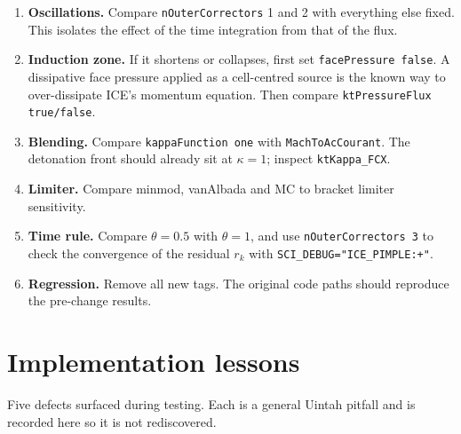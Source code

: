 \documentclass[11pt]{article}
\newcommand{\code}[1]{\texttt{\small #1}}
\begin{document}
\begin{enumerate}[leftmargin=*]
  \item \textbf{Oscillations.} Compare \code{nOuterCorrectors} 1 and 2 with everything else
        fixed. This isolates the effect of the time integration from that of the flux.
  \item \textbf{Induction zone.} If it shortens or collapses, first set
        \code{facePressure false}. A dissipative face pressure applied as a cell-centred
        source is the known way to over-dissipate ICE's momentum equation. Then compare
        \code{ktPressureFlux true/false}.
  \item \textbf{Blending.} Compare \code{kappaFunction one} with \code{MachToAcCourant}. The
        detonation front should already sit at $\kappa=1$; inspect \code{ktKappa\_FCX}.
  \item \textbf{Limiter.} Compare minmod, vanAlbada and MC to bracket limiter sensitivity.
  \item \textbf{Time rule.} Compare $\theta=0.5$ with $\theta=1$, and use \code{nOuterCorrectors 3} to check
        the convergence of the residual $r_k$ with \code{SCI\_DEBUG="ICE\_PIMPLE:+"}.
  \item \textbf{Regression.} Remove all new tags. The original code paths should reproduce
        the pre-change results.
\end{enumerate}

\section{Implementation lessons}\label{sec:lessons}

Five defects surfaced during testing. Each is a general Uintah pitfall and is recorded
here so it is not rediscovered.
\end{document}

